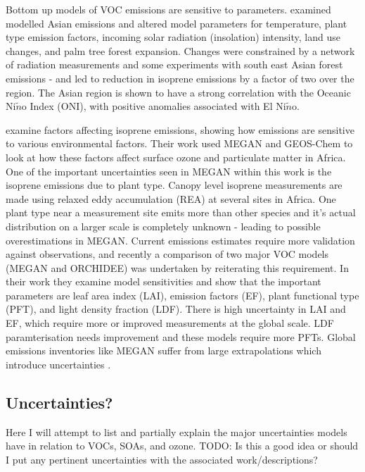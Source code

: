     Bottom up models of VOC emissions are sensitive to parameters.
    \cite{Stavrakou2014} examined modelled Asian emissions and altered model parameters for temperature, plant type emission factors, incoming solar radiation (insolation) intensity, land use changes, and palm tree forest expansion.
    Changes were constrained by a network of radiation measurements and some experiments with south east Asian forest emissions - and led to reduction in isoprene emissions by a factor of two over the region.
    The Asian region is shown to have a strong correlation with the Oceanic Ni$\tilde{n}$o Index (ONI), with positive anomalies associated with El Ni$\tilde{n}$o.
    
    
    \cite{Marais2014} examine factors affecting isoprene emissions, showing how emissions are sensitive to various environmental factors.
    Their work used MEGAN \citep{Guenther1995} and GEOS-Chem to look at how these factors affect surface ozone and particulate matter in Africa.
    One of the important uncertainties seen in MEGAN within this work is the isoprene emissions due to plant type.
    Canopy level isoprene measurements are made using relaxed eddy accumulation (REA) at several sites in Africa.
    One plant type near a measurement site emits more than other species and it's actual distribution on a larger scale is completely unknown - leading to possible overestimations in MEGAN.
    Current emissions estimates require more validation against observations, and recently a comparison of two major VOC models (MEGAN and ORCHIDEE) was undertaken by \cite{Messina2016} reiterating this requirement.
    In their work they examine model sensitivities and show that the important parameters are leaf area index (LAI), emission factors (EF), plant functional type (PFT), and light density fraction (LDF).
    There is high uncertainty in LAI and EF, which require more or improved measurements at the global scale.
    LDF paramterisation needs improvement and these models require more PFTs.
    Global emissions inventories like MEGAN suffer from large extrapolations which introduce uncertainties \citep{Miller2014}.
  
  
  \subsection{Uncertainties?}
  \label{LR:Models:Uncert}
    
    Here I will attempt to list and partially explain the major uncertainties models have in relation to  VOCs, SOAs, and ozone. 
    TODO: Is this a good idea or should I put any pertinent uncertainties with the associated work/descriptions?
    
